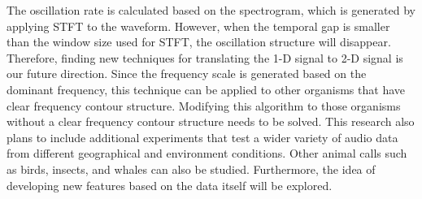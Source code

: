 The oscillation rate is calculated based on the spectrogram, which is generated by applying STFT to the waveform. However, when the temporal gap is smaller than the window size used for STFT, the oscillation structure will disappear. Therefore, finding new techniques for translating the 1-D signal to 2-D signal is our future direction. Since the frequency scale is generated based on the dominant frequency, this technique can be applied to other organisms that have clear frequency contour structure. Modifying this algorithm to those organisms without a clear frequency contour structure needs to be solved. 
This research also plans to include additional experiments that test a wider variety of audio data from different geographical and environment conditions. Other animal calls such as birds, insects, and whales can also be studied. Furthermore, the idea of developing new features based on the data itself will be explored.


